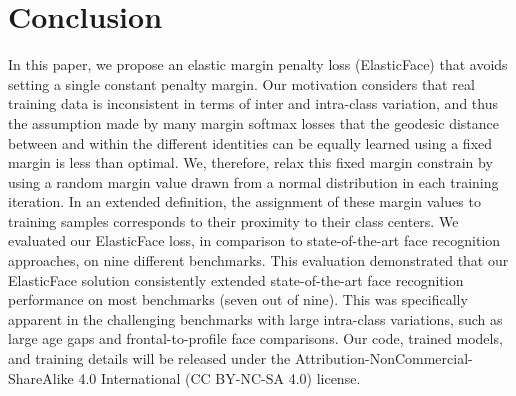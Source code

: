 \documentclass[letterpaper, 10 pt, conference]{ieeeconf}  \usepackage{times}
\begin{document}
\section{Conclusion}
In this paper, we propose an elastic margin penalty loss (ElasticFace) that avoids setting a single constant penalty margin.
Our motivation considers that real training data is inconsistent in terms of inter and intra-class variation, and thus the assumption made by many margin softmax losses that the geodesic distance between and within the different identities can be equally learned using a fixed margin is less than optimal.
We, therefore, relax this fixed margin constrain by using a random margin value drawn from a normal distribution in each training iteration.
In an extended definition, the assignment of these margin values to training samples corresponds to their proximity to their class centers. 
We evaluated our ElasticFace loss, in comparison to state-of-the-art face recognition approaches, on nine different benchmarks.
This evaluation demonstrated that our ElasticFace solution consistently extended state-of-the-art face recognition performance on most benchmarks (seven out of nine). This was specifically apparent in the challenging benchmarks with large intra-class variations, such as large age gaps and frontal-to-profile face comparisons. 
Our code, trained models, and training details will be released under the Attribution-NonCommercial-ShareAlike 4.0 International (CC BY-NC-SA 4.0) license.






{\small


}
\end{document}
